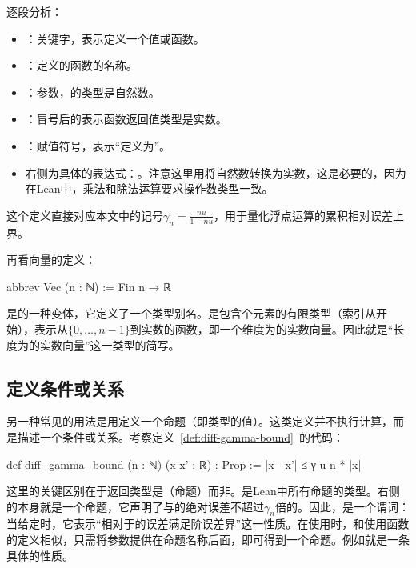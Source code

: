 ﻿\documentclass[UTF8,a4paper,openany]{ctexbook}
\theoremstyle{qrplain}
\begin{document}
逐段分析：
\begin{itemize}
  \item {}：关键字，表示定义一个值或函数。
  \item {}：定义的函数的名称。
  \item {}：参数，的类型是自然数。
  \item {}：冒号后的表示函数返回值类型是实数。
  \item \lean{:=}：赋值符号，表示“定义为”。
  \item 右侧为具体的表达式：。注意这里用将自然数转换为实数，这是必要的，因为在Lean中，乘法和除法运算要求操作数类型一致。
\end{itemize}

这个定义直接对应本文中的记号$\gamma_n=\frac{nu}{1-nu}$，用于量化浮点运算的累积相对误差上界。

再看向量的定义：

\begin{leancode}
  abbrev Vec (n : ℕ) := Fin n → ℝ
\end{leancode}

是的一种变体，它定义了一个类型别名。是包含个元素的有限类型（索引从开始），表示从$\{0,\ldots,n-1\}$到实数的函数，即一个维度为的实数向量。因此就是“长度为的实数向量”这一类型的简写。

\subsection{定义条件或关系}

另一种常见的用法是用定义一个命题（即类型的值）。这类定义并不执行计算，而是描述一个条件或关系。考察定义~\ref{def:diff-gamma-bound}~的代码：

\begin{leancode}
  def diff_gamma_bound (n : ℕ) (x x' : ℝ) : Prop :=
    |x - x'| ≤ γ u n * |x|
\end{leancode}

这里的关键区别在于返回类型是（命题）而非。是Lean中所有命题的类型。右侧的本身就是一个命题，它声明了与的绝对误差不超过$\gamma_n$倍的。因此，是一个谓词：当给定时，它表示“相对于的误差满足阶误差界”这一性质。在使用时，和使用函数的定义相似，只需将参数提供在命题名称后面，即可得到一个命题。例如就是一条具体的性质。
\end{document}
